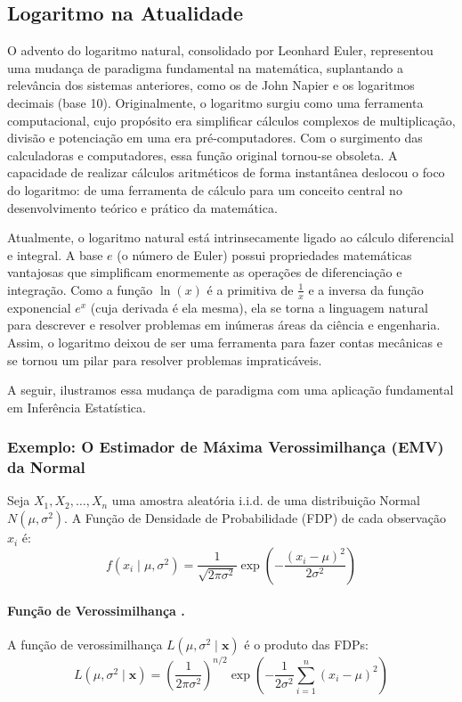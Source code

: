 \subsection*{Logaritmo na Atualidade}

O advento do logaritmo natural, consolidado por Leonhard Euler, representou uma mudança de paradigma fundamental na matemática, suplantando a relevância dos sistemas anteriores, como os de John Napier e os logaritmos decimais (base 10). Originalmente, o logaritmo surgiu como uma ferramenta computacional, cujo propósito era simplificar cálculos complexos de multiplicação, divisão e potenciação em uma era pré-computadores. Com o surgimento das calculadoras e computadores, essa função original tornou-se obsoleta. A capacidade de realizar cálculos aritméticos de forma instantânea deslocou o foco do logaritmo: de uma ferramenta de cálculo para um conceito central no desenvolvimento teórico e prático da matemática.

Atualmente, o logaritmo natural está intrinsecamente ligado ao cálculo diferencial e integral. A base $e$ (o número de Euler) possui propriedades matemáticas vantajosas que simplificam enormemente as operações de diferenciação e integração. Como a função $\ln(x)$ é a primitiva de $\frac{1}{x}$ e a inversa da função exponencial $e^x$ (cuja derivada é ela mesma), ela se torna a linguagem natural para descrever e resolver problemas em inúmeras áreas da ciência e engenharia. Assim, o logaritmo deixou de ser uma ferramenta para fazer contas mecânicas e se tornou um pilar para resolver problemas impraticáveis.

A seguir, ilustramos essa mudança de paradigma com uma aplicação fundamental em Inferência Estatística.

\subsubsection*{Exemplo: O Estimador de Máxima Verossimilhança (EMV) da Normal}
Seja $X_1, X_2, \ldots, X_n$ uma amostra aleatória i.i.d. de uma distribuição Normal $N(\mu, \sigma^2)$. A Função de Densidade de Probabilidade (FDP) de cada observação $x_i$ é:
\[
f(x_i \mid \mu, \sigma^2) = \frac{1}{\sqrt{2\pi\sigma^2}} \exp\left( -\frac{(x_i-\mu)^2}{2\sigma^2} \right)
\]

\paragraph{Função de Verossimilhança .}
A função de verossimilhança $L(\mu, \sigma^2 \mid \mathbf{x})$ é o produto das FDPs:
\begin{equation} \label{eq:likelihood}
    L(\mu, \sigma^2 \mid \mathbf{x}) = \left( \frac{1}{2\pi\sigma^2} \right)^{n/2} \exp\left( -\frac{1}{2\sigma^2} \sum_{i=1}^{n} (x_i-\mu)^2 \right)
\end{equation}

